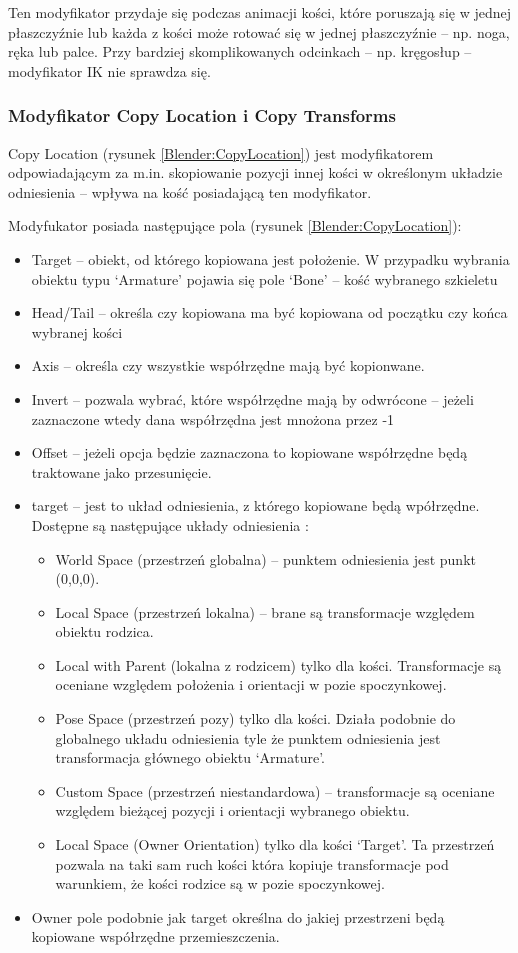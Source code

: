 \documentclass[12pt,twoside]{article}
\begin{document}
Ten modyfikator przydaje się podczas animacji kości, które poruszają się w
jednej płaszczyźnie lub każda z kości może rotować się w jednej płaszczyźnie –
np. noga, ręka lub palce. Przy bardziej skomplikowanych odcinkach -- np.
kręgosłup -- modyfikator IK nie sprawdza się. 

\subsubsection{Modyfikator Copy Location i Copy Transforms}
Copy Location (rysunek \ref{Blender:CopyLocation}) jest modyfikatorem odpowiadającym za m.in. skopiowanie pozycji
innej kości w określonym układzie odniesienia -- wpływa na kość posiadającą
ten modyfikator.

Modyfukator posiada następujące pola (rysunek \ref{Blender:CopyLocation}):
\begin{itemize}
    \item Target -- obiekt, od którego kopiowana jest położenie. W przypadku wybrania obiektu typu `Armature' pojawia się pole `Bone' -- kość wybranego szkieletu
    \item Head/Tail -- określa czy kopiowana ma być kopiowana od początku czy końca wybranej kości
    \item Axis -- określa czy wszystkie współrzędne mają być kopionwane.
    \item Invert -- pozwala wybrać, które współrzędne mają by odwrócone -- jeżeli zaznaczone wtedy dana współrzędna jest mnożona przez -1
    \item Offset -- jeżeli opcja będzie zaznaczona to kopiowane współrzędne będą traktowane jako przesunięcie.
    \item target -- jest to układ odniesienia, z którego kopiowane będą wpółrzędne. Dostępne są następujące układy odniesienia \cite{blender_Space_Types}:
    \begin{itemize}
	\item World Space (przestrzeń globalna) -- punktem odniesienia jest punkt (0,0,0).
	\item Local Space (przestrzeń lokalna) -- brane są transformacje względem obiektu rodzica.
	\item Local with Parent (lokalna z rodzicem) tylko dla kości. Transformacje są oceniane względem położenia i orientacji w pozie spoczynkowej.
	\item Pose Space (przestrzeń pozy) tylko dla kości. Działa podobnie do globalnego układu odniesienia tyle że punktem odniesienia jest transformacja głównego obiektu `Armature'.
	\item Custom Space (przestrzeń niestandardowa) -- transformacje są oceniane względem bieżącej pozycji i orientacji wybranego obiektu.
	\item Local Space (Owner Orientation)  tylko dla kości `Target'.  Ta przestrzeń pozwala na taki sam ruch kości która kopiuje transformacje pod warunkiem, że kości rodzice są w pozie spoczynkowej.
    \end{itemize} 
    \item Owner pole podobnie jak target określna do jakiej przestrzeni będą kopiowane współrzędne przemieszczenia. 
\end{itemize}
\end{document}
